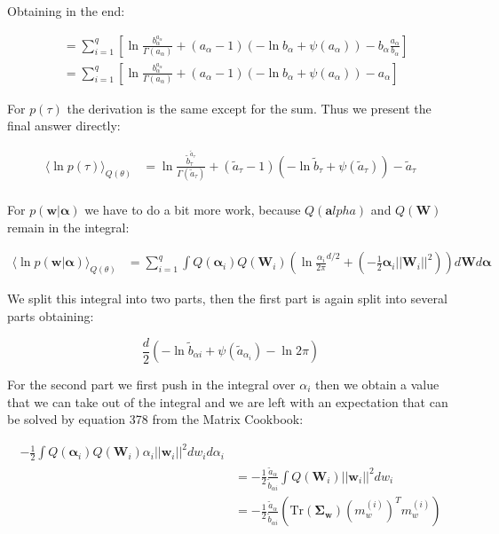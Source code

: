 \documentclass{article}
\def\*#1{\boldsymbol{#1}}
\begin{document}
Obtaining in the end:

\begin{align*}
&= \sum_{i=1}^q \left [ \ln \frac{b_\alpha^{a_\alpha}}{\Gamma(a_\alpha)} + (a_\alpha - 1)(- \ln b_\alpha + \psi(a_\alpha)) - b_\alpha \frac{a_\alpha}{b_\alpha} \right] \\
&= \sum_{i=1}^q \left [\ln \frac{b_\alpha^{a_\alpha}}{\Gamma(a_\alpha)} + (a_\alpha - 1)(- \ln b_\alpha + \psi(a_\alpha)) - a_\alpha \right ]
\end{align*}

For $p(\tau)$ the derivation is the same except for the sum. Thus we present the final answer directly:

\begin{align*}
\langle \ln p(\tau) \rangle_{Q(\theta)} &= \ln \frac{\tilde{b}_\tau^{\tilde{a}_\tau}}{\Gamma(\tilde{a}_\tau)} + (\tilde{a}_\tau - 1)(- \ln \tilde{b}_\tau + \psi(\tilde{a}_\tau)) - \tilde{a}_\tau \\
\end{align*}

For $p(\*w|\*\alpha)$ we have to do a bit more work, because $Q(\*alpha)$ and $Q(\*W)$ remain in the integral:

\begin{align*}
\langle \ln p(\*w|\*\alpha) \rangle_{Q(\theta)} &= \sum_{i = 1}^q \int Q(\*\alpha_i)Q(\*W_i)(\ln \frac{\alpha_i}{2\pi}^{d/2} + (- \frac12 \*\alpha_i ||\*W_i||^2 )) d\*W d\*\alpha
\end{align*}

We split this integral into two parts, then the first part is again split into several parts obtaining:

$$\frac{d}{2}( - \ln \tilde{b}_{\alpha i} + \psi(\tilde{a}_{\alpha_i}) - \ln 2\pi)$$

For the second part we first push in the integral over $\alpha_i$ then we obtain a value that we can take out of the integral and we are left with an expectation that can be solved by equation 378 from the Matrix Cookbook:

\begin{align*}
- \frac12 \int Q(\*\alpha_i) Q(\*W_i) \alpha_i ||\*w_i||^2 dw_i d\alpha_i \\
&= - \frac12 \frac{\tilde{a}_\alpha}{\tilde{b}_{\alpha i}} \int Q(\*W_i) ||\*w_i||^2 dw_i \\
&= - \frac12 \frac{\tilde{a}_\alpha}{\tilde{b}_{\alpha i}} (\mbox{Tr}(\*{\Sigma_w}) (m_w^{(i)})^T m_w^{(i)} )
\end{align*}
\end{document}
